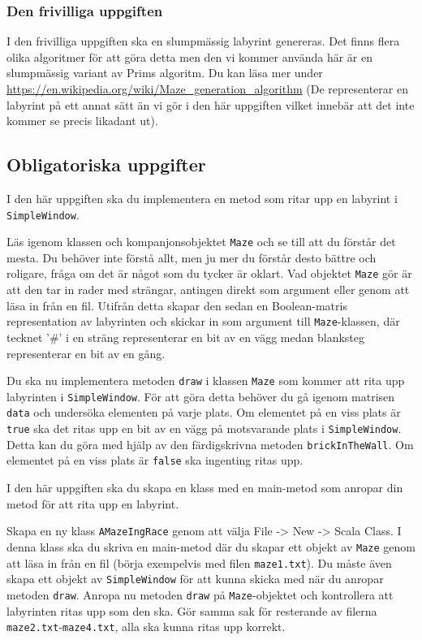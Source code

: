 \subsubsection{Den frivilliga uppgiften}

I den frivilliga uppgiften ska en slumpmässig labyrint genereras. Det finns flera olika algoritmer för att göra detta men den vi kommer använda här är en slumpmässig variant av Prims algoritm. Du kan läsa mer under \url{https://en.wikipedia.org/wiki/Maze\_generation\_algorithm} (De representerar en labyrint på ett annat sätt än vi gör i den här uppgiften vilket innebär att det inte kommer se precis likadant ut).


\subsection{Obligatoriska uppgifter}

\Task I den här uppgiften ska du implementera en metod som ritar upp en labyrint i \texttt{SimpleWindow}.

\Subtask Läs igenom klassen och kompanjonsobjektet \texttt{Maze} och se till att du förstår det mesta. Du behöver inte förstå allt, men ju mer du förstår desto bättre och roligare, fråga om det är något som du tycker är oklart. Vad objektet \texttt{Maze} gör är att den tar in rader med strängar, antingen direkt som argument eller genom att läsa in från en fil. Utifrån detta skapar den sedan en Boolean-matris representation av labyrinten och skickar in som argument till \texttt{Maze}-klassen, där tecknet '\#' i en sträng representerar en bit av en vägg medan blanksteg representerar en bit av en gång.

\Subtask Du ska nu implementera metoden \texttt{draw} i klassen \texttt{Maze} som kommer att rita upp labyrinten i \texttt{SimpleWindow}. För att göra detta behöver du gå igenom matrisen \texttt{data} och undersöka elementen på varje plats. Om elementet på en viss plats är \texttt{true} ska det ritas upp en bit av en vägg på motsvarande plats i \texttt{SimpleWindow}. Detta kan du göra med hjälp av den färdigskrivna metoden \texttt{brickInTheWall}. Om elementet på en viss plats är \texttt{false} ska ingenting ritas upp.


\Task I den här uppgiften ska du skapa en klass med en main-metod som anropar din metod för att rita upp en labyrint.

\Subtask Skapa en ny klass \texttt{AMazeIngRace} genom att välja File -> New -> Scala Class. I denna klass ska du skriva en main-metod där du skapar ett objekt av \texttt{Maze} genom att läsa in från en fil (börja exempelvis med filen \texttt{maze1.txt}). Du måste även skapa ett objekt av \texttt{SimpleWindow} för att kunna skicka med när du anropar metoden \texttt{draw}. Anropa nu metoden \texttt{draw} på \texttt{Maze}-objektet och kontrollera att labyrinten ritas upp som den ska. Gör samma sak för resterande av filerna \texttt{maze2.txt}-\texttt{maze4.txt}, alla ska kunna ritas upp korrekt.

